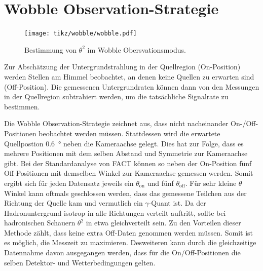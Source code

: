 \section{Wobble Observation-Strategie}
\begin{figure}
  \texttt{[image: tikz/wobble/wobble.pdf]}
  \caption{Bestimmung von $\theta^{2}$ im Wobble Obersvationsmodus.}
\end{figure}
Zur Abschätzung der Untergrundstrahlung in der Quellregion (On-Position) werden Stellen am Himmel beobachtet, an denen keine Quellen zu erwarten sind (Off-Position).
Die gemessenen Untergrundraten können dann von den Messungen in der Quellregion subtrahiert werden, um die tatsächliche Signalrate zu bestimmen.

Die Wobble Observation-Strategie zeichnet aus, dass nicht nacheinander On-/Off-Positionen beobachtet werden müssen. 
Stattdessen wird die erwartete Quellpostion \SI{0.6}{\degree} neben die Kameraachse gelegt. 
Dies hat zur Folge, dass es mehrere Positionen mit dem selben Abstand und Symmetrie zur Kameraachse gibt. 
Bei der Standardanalyse von FACT können so neben der On-Position fünf Off-Positionen mit demselben Winkel zur Kameraachse gemessen werden. 
Somit ergibt sich für jeden Datensatz jeweils ein $\theta_\text{on}$ und fünf $\theta_\text{off}$. 
Für sehr kleine $\theta$ Winkel kann oftmals geschlossen werden, dass das gemessene Teilchen aus der Richtung der Quelle kam und vermutlich ein $\gamma$-Quant ist. 
Da der Hadronuntergrund isotrop in alle Richtungen verteilt auftritt, sollte bei hadronischen Schauern $\theta^{2}$ in etwa gleichverteilt sein. 
Zu den Vorteilen dieser Methode zählt, dass keine extra Off-Daten genommen werden müssen. 
Somit ist es möglich, die Messzeit zu maximieren. 
Desweiteren kann durch die gleichzeitige Datennahme davon ausgegangen werden, dass für die On/Off-Positionen die selben Detektor- und Wetterbedingungen gelten. 

